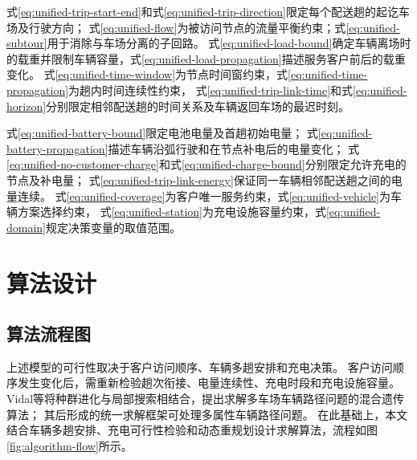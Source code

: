 \documentclass{setp-new}
\begin{document}
式\eqref{eq:unified-trip-start-end}和式\eqref{eq:unified-trip-direction}限定每个配送趟的起讫车场及行驶方向；
式\eqref{eq:unified-flow}为被访问节点的流量平衡约束；式\eqref{eq:unified-subtour}用于消除与车场分离的子回路。
式\eqref{eq:unified-load-bound}确定车辆离场时的载重并限制车辆容量，式\eqref{eq:unified-load-propagation}描述服务客户前后的载重变化。
式\eqref{eq:unified-time-window}为节点时间窗约束，式\eqref{eq:unified-time-propagation}为趟内时间连续性约束，
式\eqref{eq:unified-trip-link-time}和式\eqref{eq:unified-horizon}分别限定相邻配送趟的时间关系及车辆返回车场的最迟时刻。

式\eqref{eq:unified-battery-bound}限定电池电量及首趟初始电量；
式\eqref{eq:unified-battery-propagation}描述车辆沿弧行驶和在节点补电后的电量变化；
式\eqref{eq:unified-no-customer-charge}和式\eqref{eq:unified-charge-bound}分别限定允许充电的节点及补电量；
式\eqref{eq:unified-trip-link-energy}保证同一车辆相邻配送趟之间的电量连续。
式\eqref{eq:unified-coverage}为客户唯一服务约束，式\eqref{eq:unified-vehicle}为车辆方案选择约束，
式\eqref{eq:unified-station}为充电设施容量约束，式\eqref{eq:unified-domain}规定决策变量的取值范围。

\section{算法设计}

\subsection{算法流程图}

上述模型的可行性取决于客户访问顺序、车辆多趟安排和充电决策。
客户访问顺序发生变化后，需重新检验趟次衔接、电量连续性、充电时段和充电设施容量。
Vidal等\cite{ref:76}将种群进化与局部搜索相结合，提出求解多车场车辆路径问题的混合遗传算法；
其后形成的统一求解框架可处理多属性车辆路径问题\cite{ref:77}。
在此基础上，本文结合车辆多趟安排、充电可行性检验和动态重规划设计求解算法，流程如图\ref{fig:algorithm-flow}所示。
\end{document}
